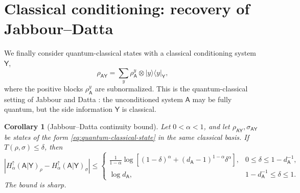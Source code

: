 \documentclass[11pt,reqno]{amsart}
\newtheorem{corollary}[corollary]{Corollary}
\theoremstyle{definition}
\newcommand{\A}{\mathsf{A}}
\newcommand{\Y}{\mathsf{Y}}
\newcommand{\abs}[1]{\left\lvert#1\right\rvert}
\begin{document}
\section{Classical conditioning: recovery of Jabbour--Datta}
\label{sec:classical-conditioning}

We finally consider quantum-classical states with a classical conditioning system $\Y$,
\begin{equation}\label{eq:quantum-classical-state}
	\rho_{\A\Y}
	=\sum_y\rho_{\A}^{y}\otimes|y\rangle\!\langle y|_{\Y},
\end{equation}
where the positive blocks $\rho_{\A}^{y}$ are subnormalized.  
This is the
quantum-classical setting of Jabbour and Datta
\cite{JabbourDatta2022}: the unconditioned system $\A$ may be fully quantum,
but the side information $\Y$ is classical.

\begin{corollary}[Jabbour--Datta continuity bound]
	\label{cor:Jabbour-Datta}
Let $0<\alpha<1$, and let $\rho_{\A\Y},\sigma_{\A\Y}$ be states of the form
\cref{eq:quantum-classical-state} in the same classical basis.  If
$T(\rho,\sigma)\leq\delta$, then
\begin{equation}\label{eq:Jabbour-Datta-bound}
 \abs{H_\alpha^\uparrow(\A|\Y)_\rho
 -H_\alpha^\uparrow(\A|\Y)_\sigma}
 \leq
 \begin{cases}
 \displaystyle
 \frac{1}{1-\alpha}
 \log\!\left[(1-\delta)^\alpha
 +(d_{\A}-1)^{1-\alpha}\delta^\alpha\right],
 &0\leq\delta\leq1-d_{\A}^{-1},\\[3mm]
 \log d_{\A},
 &1-d_{\A}^{-1}\leq\delta\leq1.
 \end{cases}
\end{equation}
The bound is sharp.
\end{corollary}
\end{document}
